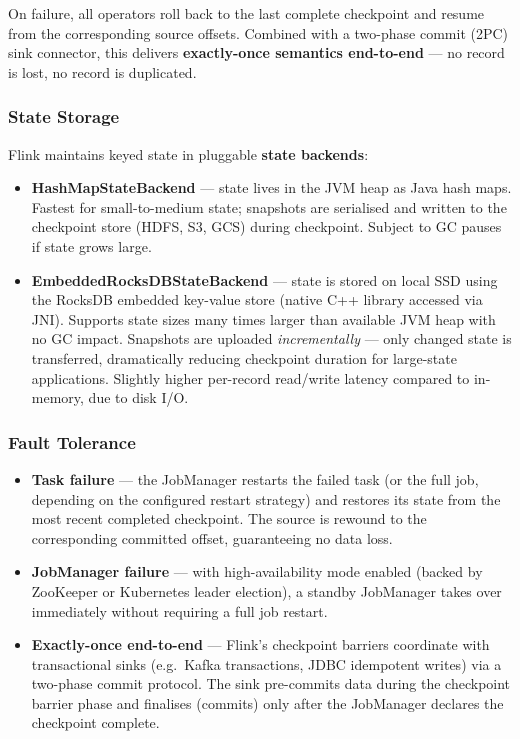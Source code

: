 On failure, all operators roll back to the last complete checkpoint and resume from the
corresponding source offsets.
Combined with a two-phase commit (2PC) sink connector, this delivers
\textbf{exactly-once semantics end-to-end} — no record is lost, no record is duplicated.

\subsubsection{State Storage}

Flink maintains keyed state in pluggable \textbf{state backends}:

\begin{itemize}
  \item \textbf{HashMapStateBackend} — state lives in the JVM heap as Java hash maps.
        Fastest for small-to-medium state; snapshots are serialised and written to the checkpoint store
        (HDFS, S3, GCS) during checkpoint.
        Subject to GC pauses if state grows large.
  \item \textbf{EmbeddedRocksDBStateBackend} — state is stored on local SSD using the RocksDB
        embedded key-value store (native C++ library accessed via JNI).
        Supports state sizes many times larger than available JVM heap with no GC impact.
        Snapshots are uploaded \emph{incrementally} — only changed state is transferred,
        dramatically reducing checkpoint duration for large-state applications.
        Slightly higher per-record read/write latency compared to in-memory, due to disk I/O.
\end{itemize}

\subsubsection{Fault Tolerance}

\begin{itemize}
  \item \textbf{Task failure} — the JobManager restarts the failed task (or the full job, depending on the
        configured restart strategy) and restores its state from the most recent completed checkpoint.
        The source is rewound to the corresponding committed offset, guaranteeing no data loss.
  \item \textbf{JobManager failure} — with high-availability mode enabled
        (backed by ZooKeeper or Kubernetes leader election),
        a standby JobManager takes over immediately without requiring a full job restart.
  \item \textbf{Exactly-once end-to-end} — Flink's checkpoint barriers coordinate with
        transactional sinks (e.g.\ Kafka transactions, JDBC idempotent writes) via a two-phase commit protocol.
        The sink pre-commits data during the checkpoint barrier phase and finalises
        (commits) only after the JobManager declares the checkpoint complete.
\end{itemize}

